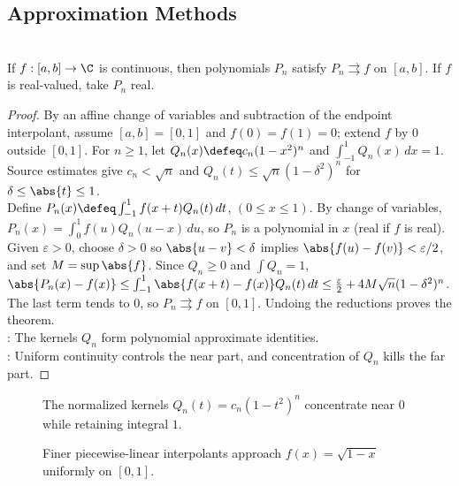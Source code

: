 \subsection{Approximation Methods}

\begin{theorem} \label{thm:weierstrass-polynomial-approximation}\label{thm:power-approx-fourier-main-source-todo} \\
If $f:[a,b]\to\C$ is continuous, then polynomials $P_n$ satisfy $P_n\rightrightarrows f$ on $[a,b]$. If $f$ is real-valued, take $P_n$ real.
\begin{proof}
By an affine change of variables and subtraction of the endpoint interpolant, assume $[a,b]=[0,1]$ and $f(0)=f(1)=0$; extend $f$ by $0$ outside $[0,1]$. For $n\geq1$, let $Q_n(x)\defeq c_n(1-x^2)^n$ and $\int_{-1}^{1}Q_n(x)\,dx=1$.\\
Source estimates give $c_n<\sqrt n$ and $Q_n(t)\leq\sqrt n(1-\delta^2)^n$ for $\delta\leq\abs{t}\leq1$.\\
Define $P_n(x)\defeq\int_{-1}^{1}f(x+t)Q_n(t)\,dt$, $(0\leq x\leq1)$. By change of variables, $P_n(x)=\int_0^1 f(u)Q_n(u-x)\,du$, so $P_n$ is a polynomial in $x$ (real if $f$ is real). Given $\varepsilon>0$, choose $\delta>0$ so $\abs{u-v}<\delta$ implies $\abs{f(u)-f(v)}<\varepsilon/2$, and set $M=\sup\abs{f}$. Since $Q_n\geq0$ and $\int Q_n=1$, $\abs{P_n(x)-f(x)} \leq \int_{-1}^{1}\abs{f(x+t)-f(x)}Q_n(t)\,dt \leq \frac{\varepsilon}{2}+4M\sqrt n(1-\delta^2)^n$.\\
The last term tends to $0$, so $P_n\rightrightarrows f$ on $[0,1]$. Undoing the reductions proves the theorem.\\
: The kernels $Q_n$ form polynomial approximate identities.\\
: Uniform continuity controls the near part, and concentration of $Q_n$ kills the far part.
\end{proof}
\end{theorem}

\begin{figure}[H]
  \centering
  
  \caption{The normalized kernels $Q_n(t)=c_n(1-t^2)^n$ concentrate near $0$ while retaining integral $1$.}
  \label{fig:polynomial-bump-kernel}
\end{figure}

\begin{figure}[H]
  \centering
  
  \caption{Finer piecewise-linear interpolants approach $f(x)=\sqrt{1-x}$ uniformly on $[0,1]$.}
  \label{fig:polygonal-approximation-sqrt-one-minus-x}
\end{figure}

